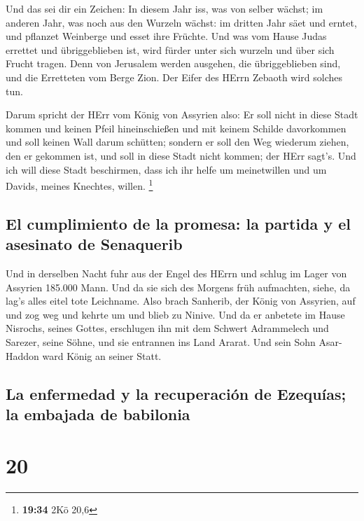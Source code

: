  Und das sei dir ein Zeichen: In diesem Jahr iss, was von
selber wächst; im anderen Jahr, was noch aus den Wurzeln wächst: im
dritten Jahr säet und erntet, und pflanzet Weinberge und esset ihre
Früchte.  Und was vom Hause Judas errettet und
übriggeblieben ist, wird fürder unter sich wurzeln und über sich Frucht
tragen.  Denn von Jerusalem werden ausgehen, die
übriggeblieben sind, und die Erretteten vom Berge Zion. Der Eifer des
HErrn Zebaoth wird solches tun.

 Darum spricht der HErr vom König von Assyrien also: Er
soll nicht in diese Stadt kommen und keinen Pfeil hineinschießen und mit
keinem Schilde davorkommen und soll keinen Wall darum schütten;
 sondern er soll den Weg wiederum ziehen, den er gekommen
ist, und soll in diese Stadt nicht kommen; der HErr sagt's.
 Und ich will diese Stadt beschirmen, dass ich ihr helfe
um meinetwillen und um Davids, meines Knechtes, willen. \footnote{\textbf{19:34}
  2Kö 20,6}

\hypertarget{el-cumplimiento-de-la-promesa-la-partida-y-el-asesinato-de-senaquerib}{%
\subsection{El cumplimiento de la promesa: la partida y el asesinato de
Senaquerib}\label{el-cumplimiento-de-la-promesa-la-partida-y-el-asesinato-de-senaquerib}}

 Und in derselben Nacht fuhr aus der Engel des HErrn und
schlug im Lager von Assyrien 185.000 Mann. Und da sie sich des Morgens
früh aufmachten, siehe, da lag's alles eitel tote Leichname.
 Also brach Sanherib, der König von Assyrien, auf und zog
weg und kehrte um und blieb zu Ninive.  Und da er
anbetete im Hause Nisrochs, seines Gottes, erschlugen ihn mit dem
Schwert Adrammelech und Sarezer, seine Söhne, und sie entrannen ins Land
Ararat. Und sein Sohn Asar-Haddon ward König an seiner Statt.

\hypertarget{la-enfermedad-y-la-recuperaciuxf3n-de-ezequuxedas-la-embajada-de-babilonia}{%
\subsection{La enfermedad y la recuperación de Ezequías; la embajada de
babilonia}\label{la-enfermedad-y-la-recuperaciuxf3n-de-ezequuxedas-la-embajada-de-babilonia}}

\hypertarget{section-19}{%
\section{20}\label{section-19}}

